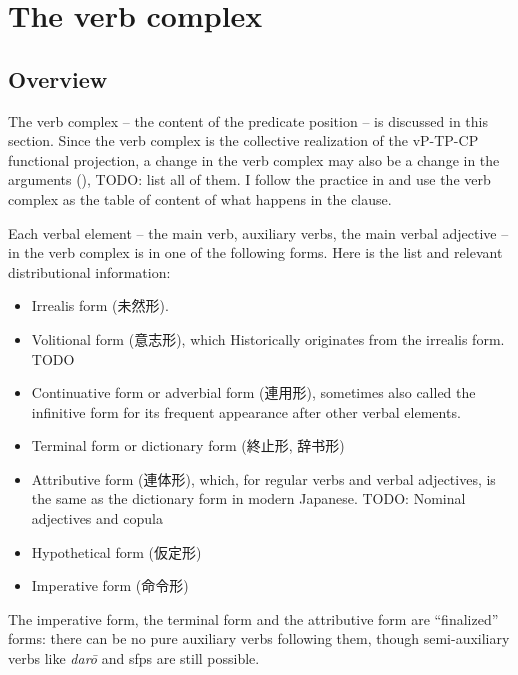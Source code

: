 \documentclass[UTF8, a4paper, oneside, scheme=plain]{ctexart}
\newcommand{\corpus}[1]{\emph{#1}}
\begin{document}
\section{The verb complex}

\subsection{Overview}\label{sec:verb-complex-overview}

The verb complex -- the content of the predicate position -- is discussed in this section.
Since the verb complex is the collective realization of the vP-TP-CP functional projection,
a change in the verb complex may also be a change in 
the arguments (),
TODO: list all of them.
I follow the practice in \citet{jacques2021grammar}
and use the verb complex as the table of content of what happens in the clause.

Each verbal element -- the main verb, auxiliary verbs, the main verbal adjective -- 
in the verb complex is in one of the following forms.
Here is the list and relevant distributional information:
\begin{itemize}
    \item Irrealis form (未然形). 
    \item Volitional form (意志形), which Historically originates from the irrealis form. TODO
    \item Continuative form or adverbial form (連用形), 
    sometimes also called the infinitive form
    for its frequent appearance after other verbal elements.
    \item Terminal form or dictionary form (終止形, 辞书形)
    \item Attributive form (連体形), which, for regular verbs and verbal adjectives, 
    is the same as the dictionary form in modern Japanese.
    TODO: Nominal adjectives and copula 
    \item Hypothetical form (仮定形)
    \item Imperative form (命令形)
\end{itemize}
The imperative form, the terminal form and the attributive form are ``finalized'' forms: 
there can be no pure auxiliary verbs following them,
though semi-auxiliary verbs like \corpus{dar\={o}} and \ac{sfp}s are still possible.
\end{document}
